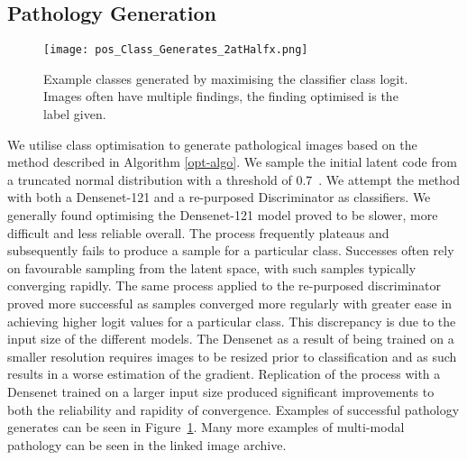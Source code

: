 \documentclass{article}
\begin{document}
\subsection{Pathology Generation}
\label{sec:discriminator}
\begin{figure}[!htb]
    \centering
    \texttt{[image: pos\_Class\_Generates\_2atHalfx.png]}
    \caption{Example classes generated by maximising the classifier class logit. Images often have multiple findings, the finding optimised is the label given.}
    \label{fig:class-pos}
\end{figure}
We utilise class optimisation to generate pathological images based on the method described in Algorithm \ref{opt-algo}. We sample the initial latent code from a truncated normal distribution with a threshold of \num{0.7}~\cite{brockLargeScaleGAN2019a}. We attempt the method with both a Densenet-121 and a re-purposed Discriminator as classifiers. We generally found optimising the Densenet-121 model proved to be slower, more difficult and less reliable overall. The process frequently plateaus and subsequently fails to produce a sample for a particular class. Successes often rely on favourable sampling from the latent space, with such samples typically converging rapidly. The same process applied to the re-purposed discriminator proved more successful as samples converged more regularly with greater ease in achieving higher logit values for a particular class. This discrepancy is due to the input size of the different models. The Densenet as a result of being trained on a smaller resolution requires images to be resized prior to classification and as such results in a worse estimation of the gradient. Replication of the process with a Densenet trained on a larger input size produced significant improvements to both the reliability and rapidity of convergence. Examples of successful pathology generates can be seen in Figure~\ref{fig:class-pos}. Many more examples of multi-modal pathology can be seen in the linked image archive. 
\end{document}
